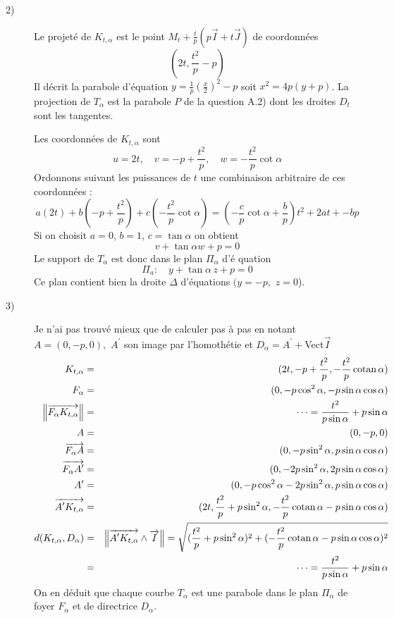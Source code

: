 \begin{description}
\begin{description}
\item[2)]  Le projet\'{e} de $K_{t,\alpha }$ est le point $M_{t}+\frac{t}{p}%
(p\overrightarrow{I}+t\overrightarrow{J})$ de coordonn\'{e}es 
\[
(2t,\frac{t^{2}}{p}-p)
\]
Il d\'{e}crit la parabole d'\'{e}quation $y=\frac{1}{p}(\frac{x}{2})^{2}-p$
soit $x^{2}=4p(y+p)$. La projection de $T_{\alpha }$ est la parabole $P$ de
la question A.2) dont les droites $D_{t}$ sont les tangentes.

Les coordonn\'{e}es de $K_{t,\alpha }$ sont 
\[
u=2t,\quad v=-p+\frac{t^{2}}{p},\quad w=-\frac{t^{2}}{p}\cot \alpha 
\]
Ordonnons suivant les puissances de $t$ une combinaison arbitraire de ces
coordonn\'{e}es :
\[
a(2t)+b(-p+\frac{t^{2}}{p})+c(-\frac{t^{2}}{p}\cot \alpha )=(-\frac{c}{p}%
\cot \alpha +\frac{b}{p})t^{2}+2at+-bp
\]
Si on choisit $a=0$, $b=1$, $c=\tan \alpha $ on obtient 
\[
v+\tan \alpha w+p=0
\]
Le support de $T_{\alpha }$ est donc dans le plan $\Pi _{\alpha }$ d'\'{e}%
quation 
\[
\Pi _{a}:\quad y+\tan \alpha \,z+p=0
\]
Ce plan contient bien la droite $\Delta $ d'\'{e}quations $(y=-p,$ $z=0$).

\item[3)]  Je n'ai pas trouv\'{e} mieux que de calculer pas \`{a} pas en
notant $A=(0,-p,0),$ $A^{\prime }$ son image par l'homoth\'{e}tie et $%
D_{\alpha }=A^{\prime }+$Vect$\overrightarrow{I}$%
\begin{eqnarray*}
K_{t,\alpha } &=&(2t,-p+\frac{t^{2}}{p},-\frac{t^{2}}{p}\cot \alpha ) \\
F_{\alpha } &=&(0,-p\cos ^{2}\alpha ,-p\sin \alpha \cos \alpha ) \\
\left\| \overrightarrow{F_{\alpha }K_{t,\alpha }}\right\|  &=&\cdots =\frac{%
t^{2}}{p\sin \alpha }+p\sin \alpha  \\
A &=&(0,-p,0) \\
\overrightarrow{F_{\alpha }A} &=&(0,-p\sin ^{2}\alpha ,p\sin \alpha \cos
\alpha ) \\
\overrightarrow{F_{\alpha }A^{\prime }} &=&(0,-2p\sin ^{2}\alpha ,2p\sin
\alpha \cos \alpha ) \\
A^{\prime } &=&(0,-p\cos ^{2}\alpha -2p\sin ^{2}\alpha ,p\sin \alpha \cos
\alpha ) \\
\overrightarrow{A^{\prime }K_{t,\alpha }} &=&(2t,\frac{t^{2}}{p}+p\sin
^{2}\alpha ,-\frac{t^{2}}{p}\cot \alpha -p\sin \alpha \cos \alpha ) \\
d(K_{t,\alpha },D_{\alpha }) &=&\left\| \overrightarrow{A^{\prime
}K_{t,\alpha }}\wedge \overrightarrow{I}\right\| =\sqrt{(\frac{t^{2}}{p}%
+p\sin ^{2}\alpha )^{2}+(-\frac{t^{2}}{p}\cot \alpha -p\sin \alpha \cos
\alpha )^{2}} \\
&=&\cdots =\frac{t^{2}}{p\sin \alpha }+p\sin \alpha 
\end{eqnarray*}
On en d\'{e}duit que chaque courbe $T_{\alpha }$ est une parabole dans le
plan $\Pi _{\alpha }$ de foyer $F_{\alpha }$ et de directrice $D_{\alpha }$.
\end{description}
\end{description}

